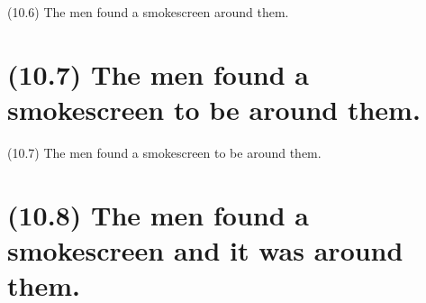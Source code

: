 \documentclass{article}
\begin{document}
\bigbreak
\begin{enumerate*}
\item[(10.6)] The men found a smokescreen around them.
\end{enumerate*}
\bigbreak

\bigbreak
\begin{minipage}{\textwidth}
\end{minipage}
\bigbreak

\clearpage

%
%

\section*{(10.7) The men found a smokescreen to be around them.}

\bigbreak
\begin{enumerate*}
\item[(10.7)] The men found a smokescreen to be around them.
\end{enumerate*}
\bigbreak

\bigbreak
\begin{minipage}{\textwidth}
\end{minipage}
\bigbreak

\clearpage

%
%

\section*{(10.8) The men found a smokescreen and it was around them.}
\end{document}

